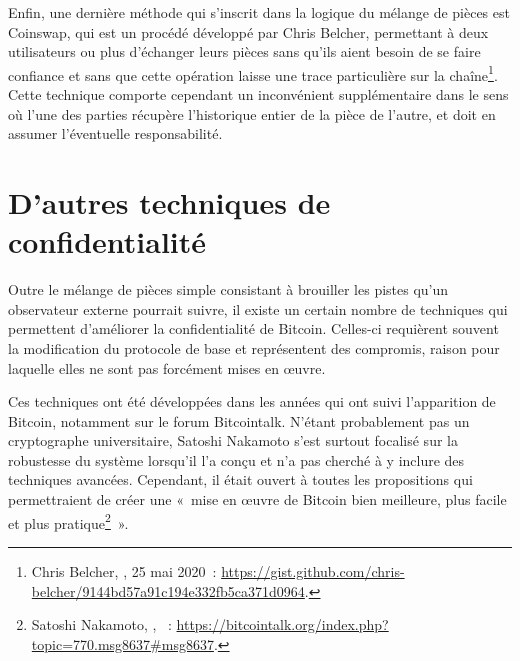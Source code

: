 Enfin, une dernière méthode qui s'inscrit dans la logique du mélange de pièces est Coinswap, qui est un procédé développé par Chris Belcher, permettant à deux utilisateurs ou plus d'échanger leurs pièces sans qu'ils aient besoin de se faire confiance et sans que cette opération laisse une trace particulière sur la chaîne\footnote{Chris Belcher, , 25 mai 2020~: \url{https://gist.github.com/chris-belcher/9144bd57a91c194e332fb5ca371d0964}.}. Cette technique comporte cependant un inconvénient supplémentaire dans le sens où l'une des parties récupère l'historique entier de la pièce de l'autre, et doit en assumer l'éventuelle responsabilité.

\section*{D'autres techniques de confidentialité}


Outre le mélange de pièces simple consistant à brouiller les pistes qu'un observateur externe pourrait suivre, il existe un certain nombre de techniques qui permettent d'améliorer la confidentialité de Bitcoin. Celles-ci requièrent souvent la modification du protocole de base et représentent des compromis, raison pour laquelle elles ne sont pas forcément mises en œuvre.

Ces techniques ont été développées dans les années qui ont suivi l'apparition de Bitcoin, notamment sur le forum Bitcointalk. N'étant probablement pas un cryptographe universitaire, Satoshi Nakamoto s'est surtout focalisé sur la robustesse du système lorsqu'il l'a conçu et n'a pas cherché à y inclure des techniques avancées. Cependant, il était ouvert à toutes les propositions qui permettraient de créer une «~mise en œuvre de Bitcoin bien meilleure, plus facile et plus pratique\footnote{Satoshi Nakamoto, , ~: \url{https://bitcointalk.org/index.php?topic=770.msg8637\#msg8637}.}~».




